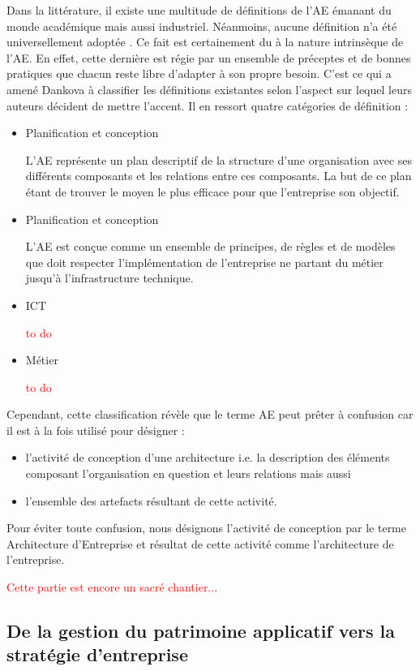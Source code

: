 Dans la littérature, il existe une multitude de définitions de l'AE émanant du monde académique mais aussi industriel. Néanmoins, aucune définition n'a été universellement adoptée \cite{mentz2012comparison} \cite{ranganathan2005enterprise}. Ce fait est certainement du à la nature intrinsèque de l'AE. En effet, cette dernière est régie par un ensemble de préceptes et de bonnes pratiques que chacun reste libre d'adapter à son propre besoin. C'est ce qui a amené Dankova à classifier les définitions existantes selon l'aspect sur lequel leurs auteurs décident de mettre l'accent. Il en ressort quatre catégories de définition : 
\begin{itemize}
\item Planification et conception

L'AE représente un plan descriptif de la structure d'une organisation avec ses différents composants et les relations entre ces composants. La but de ce plan étant de trouver le moyen le plus efficace pour que l'entreprise  son objectif.
\item Planification et conception

L'AE est conçue comme un ensemble de principes, de règles et de modèles que doit respecter l'implémentation de l'entreprise ne partant du métier jusqu'à l'infrastructure technique.
\item ICT

\textcolor{red}{to do}
\item Métier

\textcolor{red}{to do}
\end{itemize}


Cependant, cette classification révèle que le terme AE peut prêter à confusion car il est à la fois utilisé pour désigner :
\begin{itemize}
\item l'activité de conception d'une architecture i.e. la description des éléments composant l'organisation en question et leurs relations mais aussi 
\item l'ensemble des artefacts résultant de cette activité.
\end{itemize}

Pour éviter toute confusion, nous désignons l'activité de conception par le terme Architecture d'Entreprise et résultat de cette activité comme l'architecture de l'entreprise.

\textcolor{red}{Cette partie est encore un sacré chantier...}


\subsection{De la gestion du patrimoine applicatif vers la stratégie 
d'entreprise}

